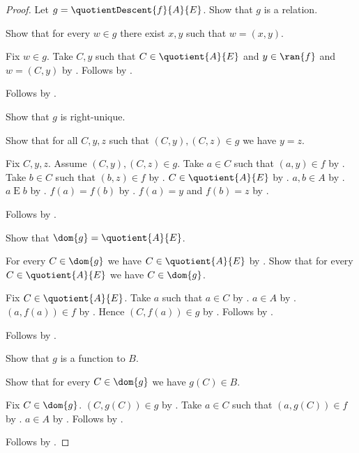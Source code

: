 \begin{proof}
    Let $g=\quotientDescent{f}{A}{E}$.
    Show that $g$ is a relation.
    \begin{subproof}
        Show that for every $w\in g$ there exist $x,y$ such that
            $w=(x,y)$.
        \begin{subproof}
            Fix $w\in g$.
            Take $C,y$ such that $C\in\quotient{A}{E}$ and
                $y\in\ran{f}$ and $w=(C,y)$ by
                .
            Follows by \auto.
        \end{subproof}
        Follows by .
    \end{subproof}
    Show that $g$ is right-unique.
    \begin{subproof}
        Show that for all $C,y,z$ such that $(C,y),(C,z)\in g$
            we have $y=z$.
        \begin{subproof}
            Fix $C,y,z$.
            Assume $(C,y),(C,z)\in g$.
            Take $a\in C$ such that $(a,y)\in f$ by
                .
            Take $b\in C$ such that $(b,z)\in f$ by
                .
            $C\in\quotient{A}{E}$ by .
            $a,b\in A$ by .
            $a\mathrel{E}b$ by .
            $f(a)=f(b)$ by .
            $f(a)=y$ and $f(b)=z$ by
                .
        \end{subproof}
        Follows by .
    \end{subproof}
    Show that $\dom{g}=\quotient{A}{E}$.
    \begin{subproof}
        For every $C\in\dom{g}$ we have $C\in\quotient{A}{E}$ by
            .
        Show that for every $C\in\quotient{A}{E}$ we have $C\in\dom{g}$.
        \begin{subproof}
            Fix $C\in\quotient{A}{E}$.
            Take $a$ such that $a\in C$ by
                .
            $a\in A$ by .
            $(a,f(a))\in f$ by
                .
            Hence $(C,f(a))\in g$ by .
            Follows by .
        \end{subproof}
        Follows by .
    \end{subproof}
    Show that $g$ is a function to $B$.
    \begin{subproof}
        Show that for every $C\in\dom{g}$ we have $g(C)\in B$.
        \begin{subproof}
            Fix $C\in\dom{g}$.
            $(C,g(C))\in g$ by .
            Take $a\in C$ such that $(a,g(C))\in f$ by
                .
            $a\in A$ by .
            Follows by .
        \end{subproof}
    \end{subproof}
    Follows by .
\end{proof}

